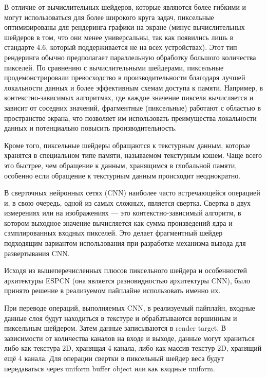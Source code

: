 \documentclass[a4paper,14pt]{extreport}
\begin{document}
            В отличие от вычислительных шейдеров, которые являются более гибкими и могут использоваться для более широкого круга задач, пиксельные оптимизированы для рендеринга графики на экране (минус вычислительных шейдеров в том, что они менее универсальны, так как появились лишь в стандарте 4.6, который поддерживается не на всех устройствах). Этот тип рендеринга обычно предполагает параллельную обработку большого количества пикселей. По сравнению с вычислительными шейдерами, пиксельные продемонстрировали превосходство в производительности благодаря лучшей локальности данных и более эффективным схемам доступа к памяти. Например, в контекстно-зависимых алгоритмах, где каждое значение пикселя вычисляется и зависит от соседних значений, фрагментные (пиксельные) работают с областью в пространстве экрана, что позволяет им использовать преимущества локальности данных и потенциально повысить производительность.
            
            Кроме того, пиксельные шейдеры обращаются к текстурным данным, которые хранятся в специальном типе памяти, называемом текстурным кэшем. Чаще всего это быстрее, чем обращение к данным, хранящимся в глобальной памяти, особенно если обращение к текстурным данным происходит неоднократно.
            
            В сверточных нейронных сетях (CNN) наиболее часто встречающейся операцией и, в свою очередь, одной из самых сложных, является свертка. Свертка в двух измерениях или на изображениях — это контекстно-зависимый алгоритм, в котором выходное значение вычисляется как сумма произведений ядра и сэмплированных входных пикселей. Это делает фрагментный шейдер подходящим вариантом использования при разработке механизма вывода для развертывания CNN.

            Исходя из вышеперечисленных плюсов пиксельного шейдера и особенностей архитектуры ESPCN (она является разновидностью архитектуры CNN), было принято решение в реализуемом пайплайне использовать именно их.

            При переводе операций, выполняемых CNN, в реализуемый пайплайн, входные данные слоя будут находиться в текстуре и обрабатываются вершинным и пиксельным шейдером. Затем данные записываются в render target. В зависимости от количества каналов на входе и выходе, данные могут храниться либо как текстура 2D, хранящая 4 канала, либо как массив текстур 2D, хранящий ещё 4 канала. Для операции свертки в пиксельный шейдер веса будут передаваться через uniform buffer object или как входные uniform.
            
\end{document}
